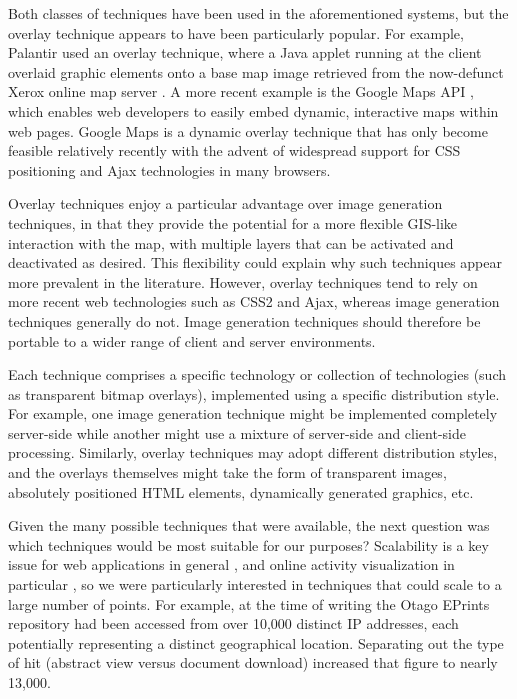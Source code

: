 \documentclass[acmtocl,acmnow]{acmtrans2m}
\begin{document}
Both classes of techniques have been used in the aforementioned systems,
but the overlay technique appears to have been particularly popular. For
example, Palantir used an overlay technique, where a Java applet running
at the client overlaid graphic elements onto a base map image retrieved
from the now-defunct Xerox online map server
\cite{Papa-N-1998-Palantir}. A more recent example is the Google Maps
API \cite{Goog-M-2006-maps}, which enables web developers to easily
embed dynamic, interactive maps within web pages. Google Maps is a
dynamic overlay technique that has only become feasible relatively
recently with the advent of widespread support for CSS positioning and
Ajax technologies in many browsers.

Overlay techniques enjoy a particular advantage over image generation
techniques, in that they provide the potential for a more flexible GIS-like
interaction with the map, with multiple layers that can be activated and
deactivated as desired. This flexibility could explain why such techniques
appear more prevalent in the literature. However, overlay techniques tend
to rely on more recent web technologies such as CSS2 and Ajax, whereas
image generation techniques generally do not. Image generation techniques
should therefore be portable to a wider range of client and server
environments.

Each technique comprises a specific technology or collection of
technologies (such as transparent bitmap overlays), implemented using a
specific distribution style. For example, one image generation technique
might be implemented completely server-side while another might use a
mixture of server-side and client-side processing. Similarly, overlay
techniques may adopt different distribution styles, and the overlays
themselves might take the form of transparent images, absolutely
positioned HTML elements, dynamically generated graphics, etc.

Given the many possible techniques that were available, the next
question was which techniques would be most suitable for our purposes?
Scalability is a key issue for web applications in general \cite[p.\
28]{Offu-J-2002-quality}, and online activity visualization in
particular \cite[p.\ 50]{Eick-SG-2001-sitevis}, so we were particularly
interested in techniques that could scale to a large number of points.
For example, at the time of writing the Otago EPrints repository had
been accessed from over 10,000 distinct IP addresses, each potentially
representing a distinct geographical location. Separating out the type
of hit (abstract view versus document download) increased that figure to
nearly 13,000.
\end{document}
